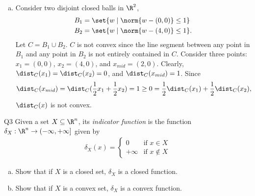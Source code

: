 \documentclass{article}
\theoremstyle{plain}
\theoremstyle{definition}
\theoremstyle{remark}
\begin{document}
\begin{solution}
\begin{enumerate}[(a)]
{\begin{proof}
\begin{enumerate}[(i)]
                    \item \textbf{Continuity:} Given two points $x, y\in \R^n$, let $w^*$ be the point in $C$ that achieves the infimum for $x$ (\ie $\norm{w^*-x}=\dist_C(x)$). Then
                    \begin{align*}
                        \dist_C(y)
                        &\leq \norm{w^* - y} \\
                        &= \norm{(w^* - x) + (x - y)} \\
                        &\leq \norm{w^* - x} + \norm{x - y} && \text{(by triangle inequality)} \\
                        &= \dist_C(x) + \norm{x - y}
                    \end{align*}
                    By symmetry, we can also show that $\dist_C(x)\leq\dist_C(y)+\norm{x-y}$. Therefore, we have $|\dist_C(x)-\dist_C(y)|\leq \norm{x-y}$. This means that $\dist_C(x)$ is Lipschitz continuous with modulus $1$, which implies continuity.
                \end{enumerate}
            \end{proof}
        }
        \item Consider two disjoint closed balls in $\R^2$, {
            \begin{align*}
                B_1 &= \set{w \mid \norm{w-(0, 0)}\leq 1} \\
                B_2 &= \set{w \mid \norm{w-(4, 0)}\leq 1}.
            \end{align*}
        } Let $C=B_1\cup B_2$. $C$ is not convex since the line segment between any point in $B_1$ and any point in $B_2$ is not entirely contained in $C$. Consider three points: $x_1=(0,0)$, $x_2=(4,0)$, and $x_{mid}=(2,0)$. Clearly, $\dist_C(x_1)=\dist_C(x_2)=0$, and $\dist_C(x_{mid})=1$. Since
        \[
            \dist_C(x_{mid}) = \dist_C(\frac{1}{2}x_1+\frac{1}{2}x_2) =1 \geq 0 =\frac{1}{2}\dist_C(x_1) + \frac{1}{2}\dist_C(x_2),
        \]
        $\dist_C(x)$ is not convex.
    \end{enumerate}
\end{solution}

\begin{problem}
    {Q3}
    Given a set $X\subseteq\R^n$, its \textit{indicator function} is the function $\delta_X:\R^n\rightarrow(-\infty, +\infty]$ given by
    \begin{align*}
        \delta_X(x) = \begin{cases}
            0 & \text{if } x\in X\\
            +\infty & \text{if } x\notin X
        \end{cases}
    \end{align*}
    \begin{enumerate}[(a)]
        \item Show that if $X$ is a closed set, $\delta_X$ is a closed function.
        \item Show that if $X$ is a convex set, $\delta_X$ is a convex function.
    \end{enumerate}
\end{problem}
\end{document}
